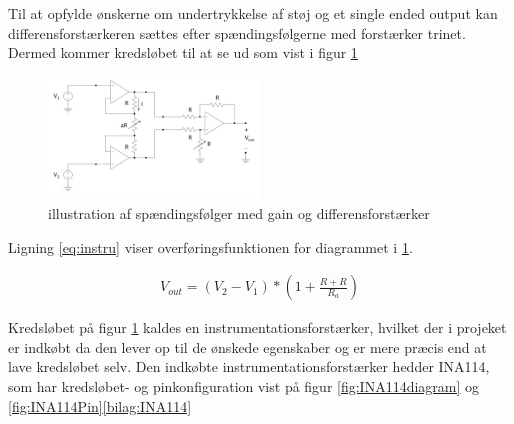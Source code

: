  Til at opfylde ønskerne om undertrykkelse af støj og et single ended output kan differensforstærkeren sættes efter spændingsfølgerne med forstærker trinet. Dermed kommer kredsløbet til at se ud som vist i figur \ref{fig:bufferampmedgaindifferens}
 
 \begin{figure}[H]
	\centering
	\includegraphics[width=0.5\textwidth]{billeder/Hardware/bufferampgaindifferens.JPG}
	\caption{illustration af spændingsfølger med gain og differensforstærker}
	\label{fig:bufferampmedgaindifferens}
\end{figure}

Ligning \ref{eq:instru} viser overføringsfunktionen for diagrammet i \ref{fig:bufferampmedgaindifferens}.

\begin{align}
 V_{out}=(V_{2}-V_{1})*(1+\frac{R+R}{R_{a}})
 \label{eq:instru}
 \end{align} 
 
Kredsløbet på figur \ref{fig:bufferampmedgaindifferens} kaldes en instrumentationsforstærker, hvilket der i projeket er indkøbt da den lever op til de ønskede egenskaber og er mere præcis end at lave kredsløbet selv. Den indkøbte instrumentationsforstærker hedder INA114, som har kredsløbet- og pinkonfiguration vist på figur \ref{fig:INA114diagram} og \ref{fig:INA114Pin}\ref{bilag:INA114}
 
